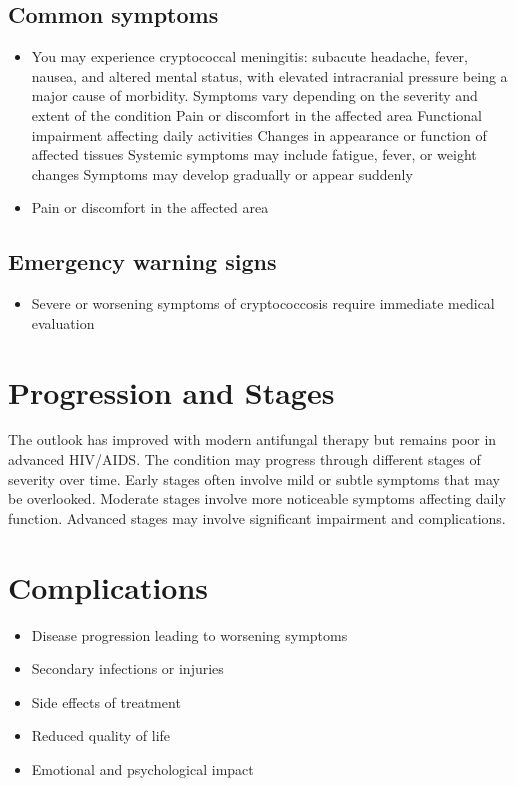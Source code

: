 \subsection{Common symptoms}
\begin{itemize}[noitemsep]
  \item You may experience cryptococcal meningitis: subacute headache, fever, nausea, and altered mental status, with elevated intracranial pressure being a major cause of morbidity. Symptoms vary depending on the severity and extent of the condition Pain or discomfort in the affected area Functional impairment affecting daily activities Changes in appearance or function of affected tissues Systemic symptoms may include fatigue, fever, or weight changes Symptoms may develop gradually or appear suddenly
  \item Pain or discomfort in the affected area
  \end{itemize}

\subsection{Emergency warning signs}
\begin{itemize}[noitemsep]
  \item Severe or worsening symptoms of cryptococcosis require immediate medical evaluation
\end{itemize}
\section{Progression and Stages}
The outlook has improved with modern antifungal therapy but remains poor in advanced HIV/AIDS. The condition may progress through different stages of severity over time. Early stages often involve mild or subtle symptoms that may be overlooked. Moderate stages involve more noticeable symptoms affecting daily function. Advanced stages may involve significant impairment and complications.
\section{Complications}
\begin{itemize}[noitemsep]
  \item Disease progression leading to worsening symptoms
  \item Secondary infections or injuries
  \item Side effects of treatment
  \item Reduced quality of life
  \item Emotional and psychological impact
\end{itemize}
